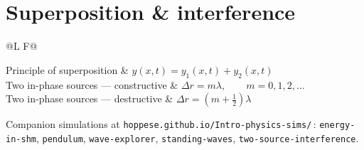 \documentclass[11pt]{article}
\makeatletter
\newcommand{\eqtab}[1]{%
  \par\vspace{0.3em}
  \noindent
  \begin{tabular}{@{}L F@{}}
  \toprule
  #1
  \bottomrule
  \end{tabular}
  \par\vspace{0.15em}}
\newcommand{\R}[2]{#1 & $\displaystyle #2$ \\}
\makeatother
\begin{document}
\section{Superposition \& interference }
\eqtab{
  \R{Principle of superposition}{y(x,t) = y_1(x,t) + y_2(x,t)}
  \R{Two in-phase sources --- constructive}{\Delta r = m\lambda,\qquad m = 0,1,2,\dots}
  \R{Two in-phase sources --- destructive}{\Delta r = \left(m + \tfrac{1}{2}\right)\lambda}
}

\vfill
{\footnotesize\color{gray}\raggedright
Companion simulations at \texttt{hoppese.github.io/Intro-physics-sims/}\,:
\texttt{energy-in-shm}, \texttt{pendulum}, \texttt{wave-explorer},
\texttt{standing-waves}, \texttt{two-source-interference}.\par}
\end{document}
